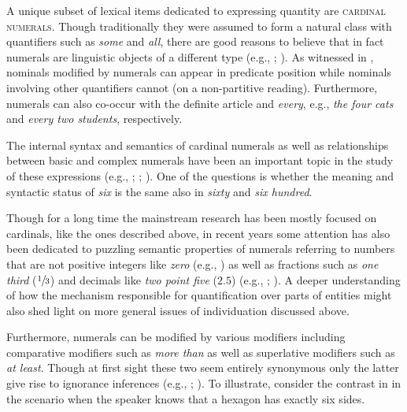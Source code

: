 \documentclass[output=paper]{langscibook}
\begin{document}
\ea\label{doc-wag:ex:much}
\z
\z

\noindent A unique subset of lexical items dedicated to expressing quantity are \textsc{cardinal numerals}. Though traditionally they were assumed to form a natural class with quantifiers such as \textit{some} and \textit{all}, there are good reasons to believe that in fact numerals are linguistic objects of a different type (e.g., \citealt[Ch.~2]{landman2004indefinites}; \citealt[Ch.~2]{rothstein2017semantics}). As witnessed in , nominals modified by numerals can appear in predicate position while nominals involving other quantifiers cannot (on a non-partitive reading). Furthermore, numerals can also co-occur with the definite article and \textit{every}, e.g., \textit{the four cats} and \textit{every two students}, respectively. 

\ea\label{doc-wag:ex:numerals}
\z
\z

\noindent The internal syntax and semantics of cardinal numerals as well as relationships between basic and complex numerals have been an important topic in the study of these expressions (e.g., \citealt{rothstein2013fregean, ionin_matushansky2018cardinals, wagiel_caha2020universal}; ; ). One of the questions is whether the meaning and syntactic status of \textit{six} is the same also in \textit{sixty} and \textit{six hundred}.

Though for a long time the mainstream research has been mostly focused on cardinals, like the ones described above, in recent years some attention has also been dedicated to puzzling semantic properties of numerals referring to numbers that are not positive integers like \textit{zero} (e.g., \citealt{bylinina_nouwen2018zero}) as well as fractions such as \textit{one third} ($\sfrac{1}{3}$) and decimals like \textit{two point five} ($2.5$) (e.g., \citealt{salmon1997}; ). A deeper understanding of how the mechanism responsible for quantification over parts of entities might also shed light on more general issues of individuation discussed above.

Furthermore, numerals can be modified by various modifiers including comparative modifiers such as \textit{more than} as well as superlative modifiers such as \textit{at least}. Though at first sight these two seem entirely synonymous only the latter give rise to ignorance inferences (e.g., \citealt{krifka1999least, nouwen2010two}; ). To illustrate, consider the contrast in  in the scenario when the speaker knows that a hexagon has exactly six sides.
\end{document}
